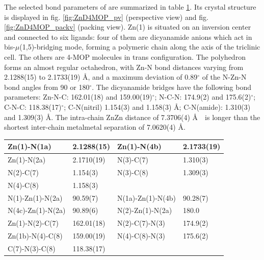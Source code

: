 The selected bond parameters of  are summarized in table \ref{batab:ZnD4MOP}. Its crystal structure is displayed in fig. \ref{fig:ZnD4MOP_pv} (perspective view) and fig. \ref{fig:ZnD4MOP_packv} (packing view).  Zn(1) is situated on an inversion center and connected to six ligands: four of them are dicyanamide anions which act in bis-$\mu$(1,5)-bridging mode, forming a polymeric chain along the axis of the triclinic cell. The others are 4-MOP molecules in trans configuration. The  polyhedron forms an almost regular octahedron, with Zn-N bond distances varying from 2.1288(15) to 2.1733(19) \AA, and a maximum deviation of 0.89$^\circ$ of the N-Zn-N bond angles from 90 or 180$^\circ$. The dicyanamide bridges have the following bond parameters: Zn-N-C: 162.01(18) and 159.00(19)$^\circ$; N-C-N: 174.9(2) and 175.6(2)$^\circ$; C-N-C: 118.38(17)$^\circ$; C-N(nitril) 1.154(3) and 1.158(3) \AA; C-N(amide): 1.310(3) and 1.309(3) \AA. The intra-chain Zn\ce{***}Zn distance of 7.3706(4) \AA \ \ is longer than the shortest inter-chain metal\ce{***}metal separation of 7.0620(4) \AA. 

\renewcommand{\arraystretch}{1.5}

\begin{table}[htpb!]
\centering
{}
\begin{tabular}{|l|l|l|l|}
\hline
Zn(1)-N(1a) & 2.1288(15) & Zn(1)-N(4b) & 2.1733(19)\\
\hline
Zn(1)-N(2a) & 2.1710(19)& N(3)-C(7) & 1.310(3)\\
\hline
N(2)-C(7) & 1.154(3) & N(3)-C(8) & 1.309(3)\\
\hline
N(4)-C(8) & 1.158(3) &  & \\
\hline
\hline
N(1)-Zn(1)-N(2a) & 90.59(7) & N(1a)-Zn(1)-N(4b) & 90.28(7)\\
\hline
N(4c)-Zn(1)-N(2a) & 90.89(6) & N(2)-Zn(1)-N(2a) & 180.0\\
\hline
Zn(1)-N(2)-C(7) & 162.01(18) & N(2)-C(7)-N(3) & 174.9(2)\\
\hline
Zn(1b)-N(4)-C(8)& 159.00(19) &N(4)-C(8)-N(3) & 175.6(2)\\
\hline
C(7)-N(3)-C(8)& 118.38(17) & &\\
\hline
\end{tabular}
\label{batab:ZnD4MOP}
\end{table}


